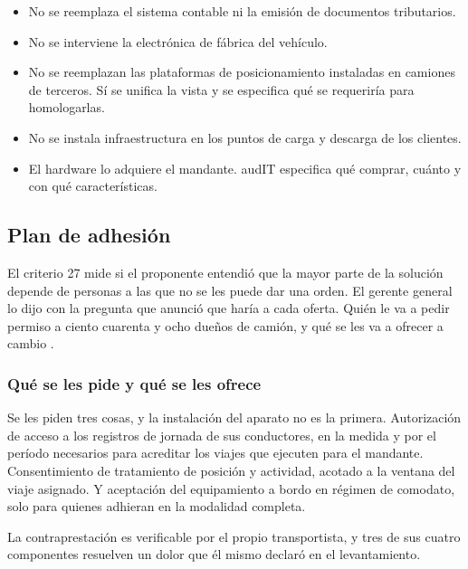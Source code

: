 \begin{itemize}
    \item No se reemplaza el sistema contable ni la emisión de documentos tributarios.
    \item No se interviene la electrónica de fábrica del vehículo.
    \item No se reemplazan las plataformas de posicionamiento instaladas en camiones de terceros.
    Sí se unifica la vista y se especifica qué se requeriría para homologarlas.
    \item No se instala infraestructura en los puntos de carga y descarga de los clientes.
    \item El hardware lo adquiere el mandante. audIT especifica qué comprar, cuánto y con qué
    características.
\end{itemize}

\subsection{Plan de adhesión}

El criterio 27 mide si el proponente entendió que la mayor parte de la solución depende de personas
a las que no se les puede dar una orden. El gerente general lo dijo con la pregunta que anunció que
haría a cada oferta. Quién le va a pedir permiso a ciento cuarenta y ocho dueños de camión, y qué
se les va a ofrecer a cambio \parencite{bases_caso10_2026}.

\subsubsection{Qué se les pide y qué se les ofrece}

Se les piden tres cosas, y la instalación del aparato no es la primera. Autorización de acceso a
los registros de jornada de sus conductores, en la medida y por el período necesarios para
acreditar los viajes que ejecuten para el mandante. Consentimiento de tratamiento de posición y
actividad, acotado a la ventana del viaje asignado. Y aceptación del equipamiento a bordo en
régimen de comodato, solo para quienes adhieran en la modalidad completa.

La contraprestación es verificable por el propio transportista, y tres de sus cuatro componentes
resuelven un dolor que él mismo declaró en el levantamiento.


